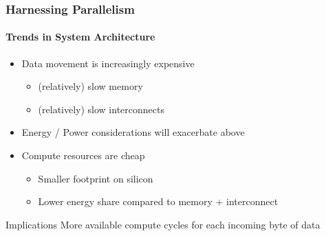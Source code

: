 \begin{frame}[t]
\frametitle{Harnessing Parallelism}
\framesubtitle{Trends in System Architecture}
    \begin{itemize}
        \item Data movement is increasingly expensive
            \begin{itemize}
                \item (relatively) slow memory
                \item (relatively) slow interconnects
            \end{itemize}
        \item Energy / Power considerations will exacerbate above
        \pause
        \item Compute resources are cheap
            \begin{itemize}
                \item Smaller footprint on silicon
                \item Lower energy share compared to memory + interconnect
            \end{itemize}
    \end{itemize}
    \pause
    \begin{block}{Implications}
       More available compute cycles for each incoming byte of data
    \end{block}
\end{frame}


